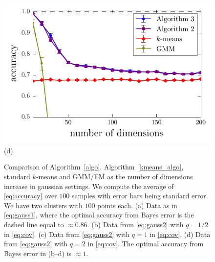\documentclass[aps,preprint,nofootinbib,floatfix]{revtex4-1}
\begin{document}
\begin{figure}
\begin{minipage}{0.49\textwidth}
\end{minipage}
\begin{minipage}{0.49\textwidth}
\includegraphics[width=1\textwidth]{gauss_cov_square.pdf}\\[-1.0em] (d)
\end{minipage}
\caption{
\label{fig:gauss}
Comparison of Algorithm~\ref{algo}, Algorithm~\ref{kmeans_algo},
standard $k$-means and GMM/EM as the number of dimensions increase
in gaussian settings.
We compute the average of \eqref{eq:accuracy} over $100$ samples with
error bars being standard error. We have two clusters with $100$ points
each. 
(a) Data as in \eqref{eq:gauss1}, where the optimal accuracy
from Bayes error is the dashed line equal to $\approx 0.86$.
(b) Data from \eqref{eq:gauss2} with $q=1/2$ in \eqref{eq:cov}. 
(c) Data from \eqref{eq:gauss2} with $q=1$ in \eqref{eq:cov}.
(d) Data from \eqref{eq:gauss2} with $q=2$ in \eqref{eq:cov}.
The optimal accuracy from Bayes error in (b--d) is $\approx 1$.
}
\end{figure}
\end{document}
